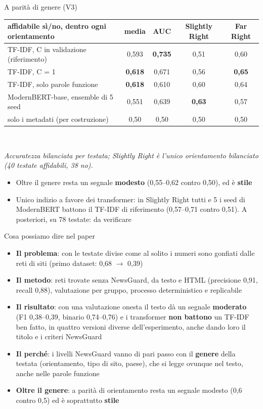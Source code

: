 \documentclass[aspectratio=169]{beamer}
\newcommand{\hl}[1]{\textbf{#1}}
\begin{document}
\begin{frame}{A parit\`a di genere (V3)}
  \vspace{0.1em}
  \centering\footnotesize
  \begin{tabular}{lcccc}
    \toprule
    \textbf{affidabile s\`i/no, dentro ogni orientamento} & \textbf{media} & \textbf{AUC} & \textbf{Slightly Right} & \textbf{Far Right} \\
    \midrule
    TF-IDF, C in validazione (riferimento) & 0,593 & \textbf{0,735} & 0,51 & 0,60 \\
    TF-IDF, C = 1 & \textbf{0,618} & 0,671 & 0,56 & \textbf{0,65} \\
    TF-IDF, solo parole funzione & \textbf{0,618} & 0,610 & 0,60 & 0,64 \\
    ModernBERT-base, ensemble di 5 seed & 0,551 & 0,639 & \textbf{0,63} & 0,57 \\
    solo i metadati (per costruzione) & 0,50 & 0,50 & 0,50 & 0,50 \\
    \bottomrule
  \end{tabular}\\[0.4em]
  \raggedright{\scriptsize\itshape Accuratezza bilanciata per testata; Slightly Right \`e l'unico orientamento bilanciato (40 testate affidabili, 38 no).}
  \begin{itemize}[<+->]
    \footnotesize
    \item Oltre il genere resta un segnale \hl{modesto} (0,55--0,62 contro 0,50), ed \`e \hl{stile}
    \item Unico indizio a favore dei transformer: in Slightly Right tutti e 5 i seed di ModernBERT battono il TF-IDF di riferimento (0,57--0,71 contro 0,51). A posteriori, su 78 testate: da verificare
  \end{itemize}
\end{frame}

\begin{frame}{Cosa possiamo dire nel paper}
  \begin{itemize}[<+->]
    \setlength\itemsep{0.55em}
    \small
    \item \hl{Il problema}: con le testate divise come al solito i numeri sono gonfiati dalle reti di siti (primo dataset: 0,68 $\to$ 0,39)
    \item \hl{Il metodo}: reti trovate senza NewsGuard, da testo e HTML (precisione 0,91, recall 0,88), valutazione per gruppo, processo deterministico e replicabile
    \item \hl{Il risultato}: con una valutazione onesta il testo d\`a un segnale \hl{moderato} (F1 0,38--0,39, binario 0,74--0,76) e i transformer \hl{non battono} un TF-IDF ben fatto, in quattro versioni diverse dell'esperimento, anche dando loro il titolo e i criteri NewsGuard
    \item \hl{Il perch\'e}: i livelli NewsGuard vanno di pari passo con il \hl{genere} della testata (orientamento, tipo di sito, paese), che si legge ovunque nel testo, anche nelle parole funzione
    \item \hl{Oltre il genere}: a parit\`a di orientamento resta un segnale modesto (0,6 contro 0,5) ed \`e soprattutto \hl{stile}
  \end{itemize}
\end{frame}
\end{document}
